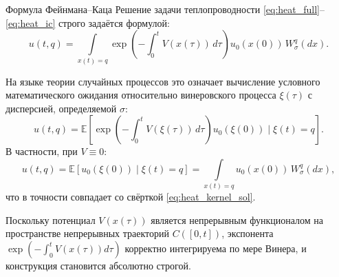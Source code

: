 \documentclass[12pt,a4paper]{article}
\begin{document}
\begin{theorybox}{Формула Фейнмана--Каца}
Решение задачи теплопроводности \eqref{eq:heat_full}--\eqref{eq:heat_ic} строго задаётся формулой:
\begin{equation}
    u(t, q) = \int\limits_{x(t)=q} \exp\!\left( -\int_0^t V(x(\tau))\, d\tau \right) u_0(x(0)) \, W_\sigma^q(dx).
\end{equation}
\end{theorybox}

На языке теории случайных процессов это означает вычисление условного математического ожидания относительно винеровского процесса $\xi(\tau)$ с дисперсией, определяемой $\sigma$:
\begin{equation}
    u(t, q) = \mathbb{E}\left[ \exp\!\left( -\int_0^t V(\xi(\tau))\, d\tau \right) u_0(\xi(0)) \;\Bigg|\; \xi(t) = q \right].
\end{equation}
В частности, при $V \equiv 0$:
\begin{equation}
    u(t, q) = \mathbb{E}[ u_0(\xi(0)) \mid \xi(t) = q ] = \int\limits_{x(t)=q} u_0(x(0)) \, W_\sigma^q(dx),
\end{equation}
что в точности совпадает со свёрткой \eqref{eq:heat_kernel_sol}. 

Поскольку потенциал $V(x(\tau))$ является непрерывным функционалом на пространстве непрерывных траекторий $C([0, t])$, экспонента $\exp\left(-\int_0^t V(x(\tau))d\tau\right)$ корректно интегрируема по мере Винера, и конструкция становится абсолютно строгой.
\end{document}
